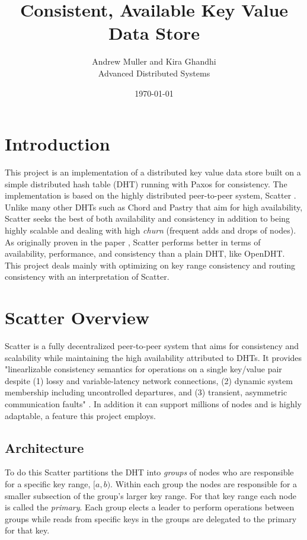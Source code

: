 \documentclass{amsart}
\theoremstyle{definition}
\theoremstyle{remark}
\numberwithin{equation}{section}
\begin{document}
\title{Consistent, Available Key Value Data Store}
\author{Andrew Muller and Kira Ghandhi \\
Advanced Distributed Systems}
\date{\today}
\maketitle

\tableofcontents

\section{Introduction}
This project is an implementation of a distributed key value data store built on a simple distributed hash table (DHT) running with Paxos \cite{Paxos} for consistency. The implementation is based on the highly distributed peer-to-peer system, Scatter \cite{Scatter}. Unlike many other DHTs such as Chord \cite{Chord} and Pastry \cite{Pastry} that aim for high availability, Scatter seeks the best of both availability and consistency in addition to being highly scalable and dealing with high \textit{churn} (frequent adds and drops of nodes). As originally proven in the paper \cite{Scatter}, Scatter performs better in terms of availability, performance, and consistency than a plain DHT, like OpenDHT. This project deals mainly with optimizing on key range consistency and routing consistency with an interpretation of Scatter.

\section{Scatter Overview}
Scatter is a fully decentralized peer-to-peer system that aims for consistency and scalability while maintaining the high availability attributed to DHTs. It provides "linearlizable consistency semantics for operations on a single key/value pair despite (1) lossy and variable-latency network connections, (2) dynamic system membership including uncontrolled departures, and (3) transient, asymmetric communication faults" \cite{Scatter}. In addition it can support  millions of nodes and is highly adaptable, a feature this project employs. 
\subsection{Architecture}
To do this Scatter partitions the DHT into \textit{groups} of nodes who are responsible for a specific key range, $[a,b)$. Within each group the nodes are responsible for a smaller subsection of the group's larger key range. For that key range each node is called the \textit{primary}. Each group elects a leader to perform operations between groups while reads from specific keys in the groups are delegated to the primary for that key.
\end{document}
